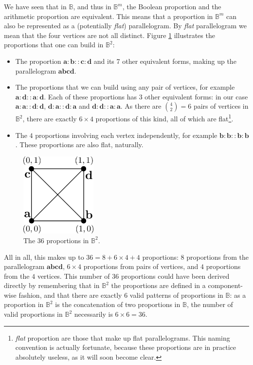 We have seen that in $\mathbb{B}$, and thus in $\mathbb{B}^m$, the Boolean
proportion and the arithmetic proportion are equivalent. This means that a
proportion in $\mathbb{B}^m$ can also be represented as a (potentially
\textit{flat}) parallelogram. By \textit{flat} parallelogram we mean that the
four vertices are not all distinct.  Figure \ref{FIG:proportions_in_B2}
illustrates the proportions that one can build in $\mathbb{B}^2$:
\begin{itemize}
  \item The proportion $\mathbf{a}: \mathbf{b} :: \mathbf{c} : \mathbf{d}$ and
    its 7 other equivalent forms, making up the parallelogram
    $\mathbf{a}\mathbf{b}\mathbf{c}\mathbf{d}$.
  \item The proportions that we can build using any pair of vertices, for
    example $\mathbf{a} : \mathbf{d} :: \mathbf{a} : \mathbf{d}$. Each of these
    proportions has $3$ other equivalent forms: in our case $\mathbf{a} :
    \mathbf{a} :: \mathbf{d} : \mathbf{d}$, $\mathbf{d} : \mathbf{a} ::
    \mathbf{d} : \mathbf{a}$ and $\mathbf{d} : \mathbf{d} :: \mathbf{a} :
    \mathbf{a}$. As there are $\binom{4}{2} = 6$ pairs of vertices in
    $\mathbb{B}^2$, there are exactly $6 \times 4$ proportions of this kind,
    all of which are flat\footnote{\textit{flat} proportion are those that make
    up flat parallelograms. This naming convention is actually fortunate,
    because these proportions are in practice absolutely useless, as it will
    soon become clear.}.
  \item The $4$ proportions involving each vertex independently, for example
    $\mathbf{b}:\mathbf{b}::\mathbf{b}:\mathbf{b}$. These proportions are also
    flat, naturally.
\end{itemize}

\begin{figure}[!h]
\centering
\includegraphics[width=1.5in]{figures/proportions_in_B2.pdf}
  \caption{The $36$ proportions in $\mathbb{B}^2$.}
\label{FIG:proportions_in_B2}
\end{figure}

All in all, this makes up to $36 = 8 + 6 \times 4 + 4$ proportions: $8$
proportions from the parallelogram $\mathbf{a}\mathbf{b}\mathbf{c}\mathbf{d}$,
$6 \times 4$ proportions from pairs of vertices, and $4$ proportions from the
$4$ vertices. This number of $36$ proportions could have been derived directly
by remembering that in $\mathbb{B}^2$ the proportions are defined in a
component-wise fashion, and that there are exactly $6$ valid patterns of
proportions in $\mathbb{B}$: as a proportion in $\mathbb{B}^2$ is the
concatenation of two proportions in $\mathbb{B}$, the number of valid
proportions in $\mathbb{B}^2$ necessarily is $6 \times 6 = 36$.

